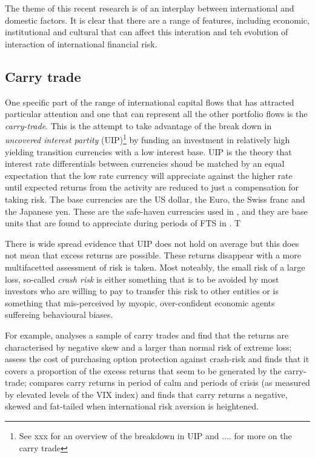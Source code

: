 \documentclass[12pt, a4paper, oneside]{article} %
\begin{document}
The theme of this recent research is of an interplay between international and domestic factors.  It is clear that there are a range of features, 
including economic, institutional and cultural that can affect this interation and teh evolution of interaction of international financial risk. 
\subsection{Carry trade}
One specific part of the range of international capital flows that has attracted particular attention and one  that can represent all the other portfolio flows is the \emph{carry-trade}.  This is the attempt to take advantage of the break down in \emph{uncovered interest partity} (UIP)\footnote{See xxx for an overview of the breakdown in UIP and .... for more on the carry trade} by funding an investment in relatively high yielding transition currencies with a low interest base.  UIP is the theory that interest rate differentials between currencies shoud be matched by an equal expectation that the low rate currency will appreciate against the higher rate until expected returns from the activity are reduced to just a compensation for taking risk. The base currencies are the US dollar, the Euro, the Swiss franc and the Japanese yen.  These are the safe-haven currencies used in \citet{HabibStracca}, and they are base units that are found to appreciate during periods of FTS in \citet{FTS}.   T

There is wide spread evidence that UIP does not hold on average but this does not mean that excess returns are possible.  These returns disappear with a more multifacetted assessment of risk is taken.  Most noteably, the small risk of a large loss, so-called \emph{crash risk} is either something that is to be avoided by most investors who are willing to pay to transfer this risk to other entities or is something that mis-perceived by myopic, over-confident economic agents suffereing behavioural biases.  

For example, \citet{BrunnermeierCarry} analyses a sample of carry trades and find that the returns are characterised by negative skew and a larger than normal risk of extreme loss; \citet{JurekCrash} assess the cost of purchasing option protection against crash-risk and finds that it covers a proportion of the excess returns that seem to be generated by the carry-trade; \citet{Hayward2013} compares carry returns in period of calm and periods of crisis (as measured by elevated levels of the VIX index) and finds that carry returns a negative, skewed and fat-tailed when international risk aversion is heightened.  
\end{document}
